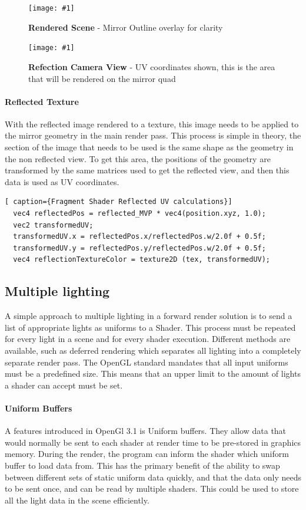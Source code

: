 \documentclass[conference]{acmsiggraph}
\newcommand{\figuremacroW}[4]{
	\begin{figure}[h] %
		\centering
		\texttt{[image: \#1]}
		\caption[#2]{\textbf{#2} - #3}
		\label{fig:#1}
	\end{figure}
}
\begin{document}
\figuremacroW
{front-Buffer}
{Rendered Scene}
{Mirror Outline overlay for clarity}
{1.0}

\figuremacroW
{ref-Buffer}
{Refection Camera View}
{UV coordinates shown, this is the area that will be rendered on the mirror quad}
{1.0}

\paragraph{Reflected Texture}
With the reflected image rendered to a texture, this image needs to be applied to the mirror geometry in the main render pass.
This process is simple in theory, the section of the image that needs to be used is the same shape as the geometry in the non reflected view.
To get this area, the positions of the geometry are transformed by the same matrices used to get the reflected view, and then this data is used as UV coordinates.

\begin{lstlisting}[ caption={Fragment Shader Reflected UV calculations}]
  vec4 reflectedPos = reflected_MVP * vec4(position.xyz, 1.0);
  vec2 transformedUV;
  transformedUV.x = reflectedPos.x/reflectedPos.w/2.0f + 0.5f;
  transformedUV.y = reflectedPos.y/reflectedPos.w/2.0f + 0.5f;
  vec4 reflectionTextureColor = texture2D (tex, transformedUV);
\end{lstlisting}

\subsection{Multiple lighting}
A simple approach to multiple lighting in a forward render solution is to send a list of appropriate lights as uniforms to a Shader.
This process must be repeated for every light in a scene and for every shader execution. Different methods are available, such as deferred rendering which separates all lighting into a completely separate render pass. The OpenGL standard mandates that all input uniforms must be a predefined size. This means that an upper limit to the amount of lights a shader can accept must be set.

\paragraph{Uniform Buffers}
A features introduced in OpenGl 3.1 is Uniform buffers. They allow data that would normally be sent to each shader at render time to be pre-stored in graphics memory. During the render, the program can inform the shader which uniform buffer to load data from. This has the primary benefit of the ability to swap between different sets of static uniform data quickly, and that the data only needs to be sent once, and can be read by multiple shaders. This could be used to store all the light data in the scene efficiently.
\end{document}
